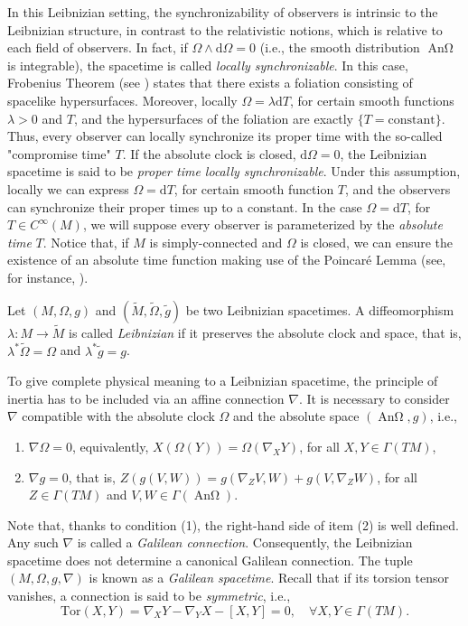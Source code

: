 \documentclass[12pt]{article}
\newcommand{\diff}{\mathrm{d}}
\newcommand{\spacetime}{(M,\Omega,g,\nabla)}
\DeclareMathOperator{\An}{\text{An}\Omega}
\begin{document}
In this Leibnizian setting, the synchronizability of observers is intrinsic to the Leibnizian structure, in contrast to the  relativistic notions, which is relative to each field of observers. In fact, if $\Omega \wedge \diff \Omega = 0$ (i.e., the smooth distribution $\An$ is integrable), the spacetime is called {\it locally synchronizable}. In this case, Frobenius Theorem (see \cite{Warner1983}) states that there exists a foliation consisting of spacelike hypersurfaces. Moreover,  locally $\Omega = \lambda \diff T$, for certain smooth functions  $\lambda>0$ and $T$, and the hypersurfaces of the foliation are exactly $\{T=\text{constant}\}$. Thus, every observer can locally synchronize its proper time with the so-called "compromise time" $T$. If the absolute clock is closed, $\diff \Omega=0$, the Leibnizian spacetime is said to be \textit{proper time locally synchronizable}. Under this assumption, locally we can express $\Omega = \diff T$, for certain smooth function $T$, and the observers can synchronize their proper times up to a constant. In the case $\Omega=\diff T$, for $T\in C^\infty(M)$, we will suppose every observer is parameterized by the \textit{absolute time} $T$. Notice that, if $M$ is simply-connected and $\Omega$ is closed, we can ensure the existence of an absolute time function making use of the Poincaré Lemma (see, for instance, \cite{Spivak1}).

Let $(M,\Omega, g)$ and $(\widetilde{M}, \widetilde{\Omega}, \widetilde{g})$ be two Leibnizian spacetimes. A diffeomorphism $\lambda\colon M \to \widetilde{M}$ is called \textit{Leibnizian} if it preserves the absolute clock and space, that is, $\lambda^* \widetilde{\Omega} = \Omega$ and $\lambda^*\widetilde{g} = g$. 

To give complete physical meaning to a Leibnizian spacetime, the principle of inertia has to be included via an affine connection $\nabla$. It is necessary to consider $\nabla$ compatible with the absolute clock $\Omega$ and the absolute space $(\An, g)$, i.e., 
\begin{enumerate}
    \item[(1)] $\nabla \Omega = 0$, equivalently, $X(\Omega(Y)) = \Omega(\nabla_X Y)$, for all $X, Y \in \Gamma(TM)$,
    \item[(2)] $\nabla g= 0$, that is, $Z(g(V,W)) = g(\nabla_Z V, W) + g(V, \nabla_Z W)$, for all $Z\in \Gamma(TM)$ and $V,W\in \Gamma(\An)$.
\end{enumerate}

Note that, thanks to condition (1), the right-hand side of item (2) is well defined.
Any such $\nabla$ is called a \textit{Galilean connection}. Consequently, the Leibnizian spacetime does not determine a canonical Galilean connection. The tuple $\spacetime$ is known as a \textit{Galilean spacetime}. Recall that if its torsion tensor vanishes, a connection is said to be \textit{symmetric}, i.e.,
$$\text{Tor}(X,Y) = \nabla_X Y - \nabla_Y X - [X,Y] = 0, \quad \forall X, Y \in \Gamma(TM).$$
\end{document}
